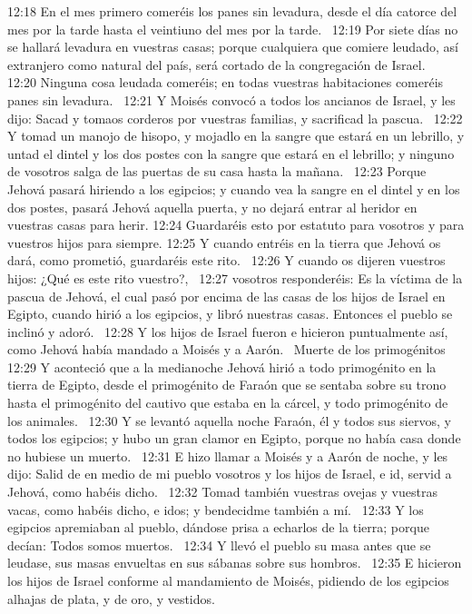 12:18 En el mes primero comeréis los panes sin levadura, desde el día catorce del mes por la tarde hasta el veintiuno del mes por la tarde.  
12:19 Por siete días no se hallará levadura en vuestras casas; porque cualquiera que comiere leudado, así extranjero como natural del país, será cortado de la congregación de Israel.  
12:20 Ninguna cosa leudada comeréis; en todas vuestras habitaciones comeréis panes sin levadura.  
12:21 Y Moisés convocó a todos los ancianos de Israel, y les dijo: Sacad y tomaos corderos por vuestras familias, y sacrificad la pascua.  
12:22 Y tomad un manojo de hisopo, y mojadlo en la sangre que estará en un lebrillo, y untad el dintel y los dos postes con la sangre que estará en el lebrillo; y ninguno de vosotros salga de las puertas de su casa hasta la mañana.  
12:23 Porque Jehová pasará hiriendo a los egipcios; y cuando vea la sangre en el dintel y en los dos postes, pasará Jehová aquella puerta, y no dejará entrar al heridor en vuestras casas para herir. 
12:24 Guardaréis esto por estatuto para vosotros y para vuestros hijos para siempre. 
12:25 Y cuando entréis en la tierra que Jehová os dará, como prometió, guardaréis este rito.  
12:26 Y cuando os dijeren vuestros hijos: ¿Qué es este rito vuestro?,  
12:27 vosotros responderéis: Es la víctima de la pascua de Jehová, el cual pasó por encima de las casas de los hijos de Israel en Egipto, cuando hirió a los egipcios, y libró nuestras casas. Entonces el pueblo se inclinó y adoró.  
12:28 Y los hijos de Israel fueron e hicieron puntualmente así, como Jehová había mandado a Moisés y a Aarón.  
Muerte de los primogénitos  
12:29 Y aconteció que a la medianoche Jehová hirió a todo primogénito en la tierra de Egipto, desde el primogénito de Faraón que se sentaba sobre su trono hasta el primogénito del cautivo que estaba en la cárcel, y todo primogénito de los animales.  
12:30 Y se levantó aquella noche Faraón, él y todos sus siervos, y todos los egipcios; y hubo un gran clamor en Egipto, porque no había casa donde no hubiese un muerto.  
12:31 E hizo llamar a Moisés y a Aarón de noche, y les dijo: Salid de en medio de mi pueblo vosotros y los hijos de Israel, e id, servid a Jehová, como habéis dicho.  
12:32 Tomad también vuestras ovejas y vuestras vacas, como habéis dicho, e idos; y bendecidme también a mí.  
12:33 Y los egipcios apremiaban al pueblo, dándose prisa a echarlos de la tierra; porque decían: Todos somos muertos.  
12:34 Y llevó el pueblo su masa antes que se leudase, sus masas envueltas en sus sábanas sobre sus hombros.  
12:35 E hicieron los hijos de Israel conforme al mandamiento de Moisés, pidiendo de los egipcios alhajas de plata, y de oro, y vestidos.  
